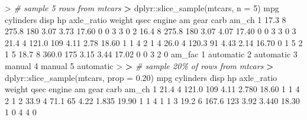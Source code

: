 \documentclass[
]{book}
\newenvironment{Shaded}{\begin{snugshade}}{\end{snugshade}}
\newcommand{\AttributeTok}[1]{\textcolor[rgb]{0.77,0.63,0.00}{#1}}
\newcommand{\CommentTok}[1]{\textcolor[rgb]{0.56,0.35,0.01}{\textit{#1}}}
\newcommand{\DecValTok}[1]{\textcolor[rgb]{0.00,0.00,0.81}{#1}}
\newcommand{\ErrorTok}[1]{\textcolor[rgb]{0.64,0.00,0.00}{\textbf{#1}}}
\newcommand{\FloatTok}[1]{\textcolor[rgb]{0.00,0.00,0.81}{#1}}
\newcommand{\FunctionTok}[1]{\textcolor[rgb]{0.00,0.00,0.00}{#1}}
\newcommand{\NormalTok}[1]{#1}
\newcommand{\SpecialCharTok}[1]{\textcolor[rgb]{0.00,0.00,0.00}{#1}}
\begin{document}
\begin{Shaded}
\begin{Highlighting}[]
\SpecialCharTok{\textgreater{}} \CommentTok{\# sample 5 rows from mtcars}
\ErrorTok{\textgreater{}}\NormalTok{ dplyr}\SpecialCharTok{::}\FunctionTok{slice\_sample}\NormalTok{(mtcars, }\AttributeTok{n =} \DecValTok{5}\NormalTok{)}
\NormalTok{   mpg cylinders  disp  hp axle\_ratio weight  qsec engine am gear carb am\_ch}
\DecValTok{1} \FloatTok{17.3}         \DecValTok{8} \FloatTok{275.8} \DecValTok{180}       \FloatTok{3.07}   \FloatTok{3.73} \FloatTok{17.60}      \DecValTok{0}  \DecValTok{0}    \DecValTok{3}    \DecValTok{3}     \DecValTok{0}
\DecValTok{2} \FloatTok{16.4}         \DecValTok{8} \FloatTok{275.8} \DecValTok{180}       \FloatTok{3.07}   \FloatTok{4.07} \FloatTok{17.40}      \DecValTok{0}  \DecValTok{0}    \DecValTok{3}    \DecValTok{3}     \DecValTok{0}
\DecValTok{3} \FloatTok{21.4}         \DecValTok{4} \FloatTok{121.0} \DecValTok{109}       \FloatTok{4.11}   \FloatTok{2.78} \FloatTok{18.60}      \DecValTok{1}  \DecValTok{1}    \DecValTok{4}    \DecValTok{2}     \DecValTok{1}
\DecValTok{4} \FloatTok{26.0}         \DecValTok{4} \FloatTok{120.3}  \DecValTok{91}       \FloatTok{4.43}   \FloatTok{2.14} \FloatTok{16.70}      \DecValTok{0}  \DecValTok{1}    \DecValTok{5}    \DecValTok{2}     \DecValTok{1}
\DecValTok{5} \FloatTok{18.7}         \DecValTok{8} \FloatTok{360.0} \DecValTok{175}       \FloatTok{3.15}   \FloatTok{3.44} \FloatTok{17.02}      \DecValTok{0}  \DecValTok{0}    \DecValTok{3}    \DecValTok{2}     \DecValTok{0}
\NormalTok{     am\_fac}
\DecValTok{1}\NormalTok{ automatic}
\DecValTok{2}\NormalTok{ automatic}
\DecValTok{3}\NormalTok{    manual}
\DecValTok{4}\NormalTok{    manual}
\DecValTok{5}\NormalTok{ automatic}
\SpecialCharTok{\textgreater{}} 
\ErrorTok{\textgreater{}} \CommentTok{\# sample 20\% of rows from mtcars}
\ErrorTok{\textgreater{}}\NormalTok{ dplyr}\SpecialCharTok{::}\FunctionTok{slice\_sample}\NormalTok{(mtcars, }\AttributeTok{prop =} \FloatTok{0.20}\NormalTok{)}
\NormalTok{   mpg cylinders  disp  hp axle\_ratio weight  qsec engine am gear carb am\_ch}
\DecValTok{1} \FloatTok{21.4}         \DecValTok{4} \FloatTok{121.0} \DecValTok{109}       \FloatTok{4.11}  \FloatTok{2.780} \FloatTok{18.60}      \DecValTok{1}  \DecValTok{1}    \DecValTok{4}    \DecValTok{2}     \DecValTok{1}
\DecValTok{2} \FloatTok{33.9}         \DecValTok{4}  \FloatTok{71.1}  \DecValTok{65}       \FloatTok{4.22}  \FloatTok{1.835} \FloatTok{19.90}      \DecValTok{1}  \DecValTok{1}    \DecValTok{4}    \DecValTok{1}     \DecValTok{1}
\DecValTok{3} \FloatTok{19.2}         \DecValTok{6} \FloatTok{167.6} \DecValTok{123}       \FloatTok{3.92}  \FloatTok{3.440} \FloatTok{18.30}      \DecValTok{1}  \DecValTok{0}    \DecValTok{4}    \DecValTok{4}     \DecValTok{0}

\end{Highlighting}
\end{Shaded}
\end{document}
